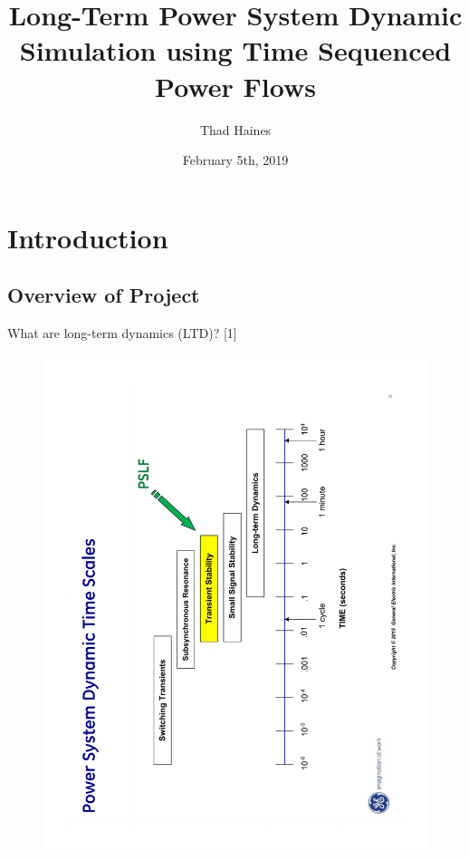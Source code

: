 \documentclass[14pt, unknownkeysallowed]{beamer}
\title{Long-Term Power System Dynamic Simulation using Time Sequenced Power Flows}
\author{Thad Haines}
\institute[MT TECH]{Montana Tech - Master's Thesis Research Project}
\date{February 5th, 2019}
\begin{document}
\begin{frame}
\titlepage
\end{frame}

\section{Introduction}
\subsection{Overview of Project}
\begin{frame}
What are long-term dynamics (LTD)? \tiny[1] \vspace{-2em}\\
\begin{figure}
	\includegraphics[angle=-90,origin=c,width=1.05\linewidth]{GEtimeScales} 
\end{figure}
\end{frame}
\end{document}

